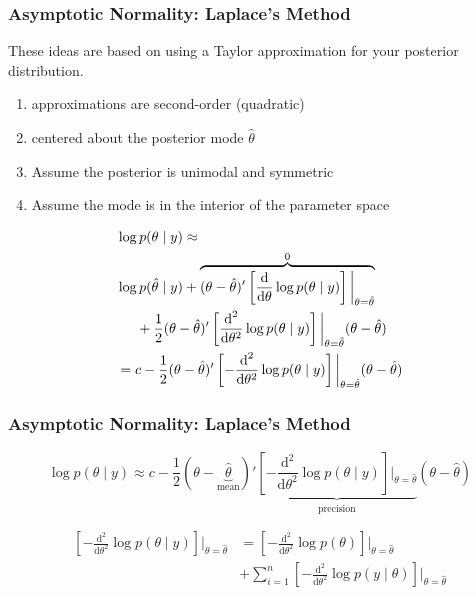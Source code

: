 \documentclass{beamer}
\begin{document}
\begin{frame}
\frametitle{Asymptotic Normality: Laplace's Method}

These ideas are based on using a Taylor approximation for your posterior distribution. 
\begin{enumerate}
\item approximations are second-order (quadratic)
\item centered about the posterior mode $\hat{\theta}$
\item Assume the posterior is unimodal and symmetric
\item Assume the mode is in the interior of the parameter space
\end{enumerate}
\pause

\begin{align*}
&\log p(\theta \mid y ) \approx \\
&\log p(\hat{\theta} \mid y) + \overbrace{(\theta - \hat{\theta})'\left[ \frac{\text{d}}{\text{d}\theta} \log p(\theta \mid y) \right] \bigg|_{\theta = \hat{\theta}}}^{0}  \\
&\hspace{5mm}  + \frac{1}{2}(\theta - \hat{\theta})'\left[\frac{\text{d}^2}{\text{d}\theta^2} \log p(\theta \mid y)\right] \bigg|_{\theta = \hat{\theta}}(\theta - \hat{\theta}) \\
&= c  - \frac{1}{2}(\theta - \hat{\theta})'\left[-\frac{\text{d}^2}{\text{d}\theta^2} \log p(\theta \mid y)\right] \bigg|_{\theta = \hat{\theta}}(\theta - \hat{\theta})
\end{align*}

\end{frame}

\begin{frame}
\frametitle{Asymptotic Normality: Laplace's Method}

\[
\log p(\theta \mid y ) \approx 
c  - \frac{1}{2}(\theta - \underbrace{\hat{\theta} }_{\text{mean}} )' \underbrace{\left[-\frac{\text{d}^2}{\text{d}\theta^2} \log p(\theta \mid y)\right] \bigg|_{\theta = \hat{\theta}}}_{\text{precision} } (\theta - \hat{\theta})
\]

\begin{align*}
\left[-\frac{\text{d}^2}{\text{d}\theta^2} \log p(\theta \mid y)\right] \bigg|_{\theta = \hat{\theta}} 
&=
\left[-\frac{\text{d}^2}{\text{d}\theta^2} \log p(\theta)\right] \bigg|_{\theta = \hat{\theta}} \\
&+
\sum_{i=1}^n \left[-\frac{\text{d}^2}{\text{d}\theta^2} \log p(y \mid \theta)\right] \bigg|_{\theta = \hat{\theta}}
\end{align*}



\end{frame}
\end{document}
